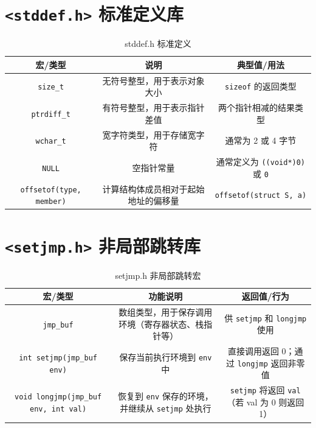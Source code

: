 \section{\texorpdfstring{\texttt{<stddef.h>} 标准定义库}{<stddef.h> 标准定义库}}

\begin{table}[H]
\centering
\small
\renewcommand{\arraystretch}{1.5}
\begin{tabulary}{\linewidth}{CCC}
\toprule
\textbf{宏/类型} & \textbf{说明} & \textbf{典型值/用法} \\ \midrule
\texttt{size\_t} & 无符号整型，用于表示对象大小 & \texttt{sizeof} 的返回类型 \\ 
\texttt{ptrdiff\_t} & 有符号整型，用于表示指针差值 & 两个指针相减的结果类型 \\ 
\texttt{wchar\_t} & 宽字符类型，用于存储宽字符 & 通常为 2 或 4 字节 \\ 
\texttt{NULL} & 空指针常量 & 通常定义为 \texttt{((void*)0)} 或 \texttt{0} \\ 
\texttt{offsetof(type, member)} & 计算结构体成员相对于起始地址的偏移量 & \texttt{offsetof(struct S, a)} \\ \bottomrule
\end{tabulary}
\caption{stddef.h 标准定义}
\label{tab:stddef}
\end{table}

\section{\texorpdfstring{\texttt{<setjmp.h>} 非局部跳转库}{<setjmp.h> 非局部跳转库}}

\begin{table}[H]
\centering
\small
\renewcommand{\arraystretch}{1.5}
\begin{tabulary}{\linewidth}{CCC}
\toprule
\textbf{宏/类型} & \textbf{功能说明} & \textbf{返回值/行为} \\ \midrule
\texttt{jmp\_buf} & 数组类型，用于保存调用环境（寄存器状态、栈指针等） & 供 \texttt{setjmp} 和 \texttt{longjmp} 使用 \\ 
\texttt{int setjmp(jmp\_buf env)} & 保存当前执行环境到 \texttt{env} 中 & 直接调用返回 0；通过 \texttt{longjmp} 返回非零值 \\ 
\texttt{void longjmp(jmp\_buf env, int val)} & 恢复到 \texttt{env} 保存的环境，并继续从 \texttt{setjmp} 处执行 & \texttt{setjmp} 将返回 \texttt{val}（若 val 为 0 则返回 1） \\ \bottomrule
\end{tabulary}
\caption{setjmp.h 非局部跳转宏}
\label{tab:setjmp}
\end{table}

